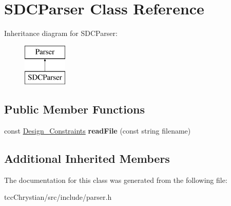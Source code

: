 \hypertarget{classSDCParser}{\section{S\-D\-C\-Parser Class Reference}
\label{classSDCParser}
}
Inheritance diagram for S\-D\-C\-Parser\-:\begin{figure}[H]
\begin{center}
\leavevmode
\includegraphics[height=2.000000cm]{classSDCParser}
\end{center}
\end{figure}
\subsection*{Public Member Functions}
\begin{DoxyCompactItemize}
\item 
\hypertarget{classSDCParser_afc0ae26ac89138dd7b84e2986375785f}{const \hyperlink{classDesign__Constraints}{Design\-\_\-\-Constraints} {\bfseries read\-File} (const string filename)}\label{classSDCParser_afc0ae26ac89138dd7b84e2986375785f}

\end{DoxyCompactItemize}
\subsection*{Additional Inherited Members}


The documentation for this class was generated from the following file\-:\begin{DoxyCompactItemize}
\item 
tcc\-Chrystian/src/include/parser.\-h\end{DoxyCompactItemize}
